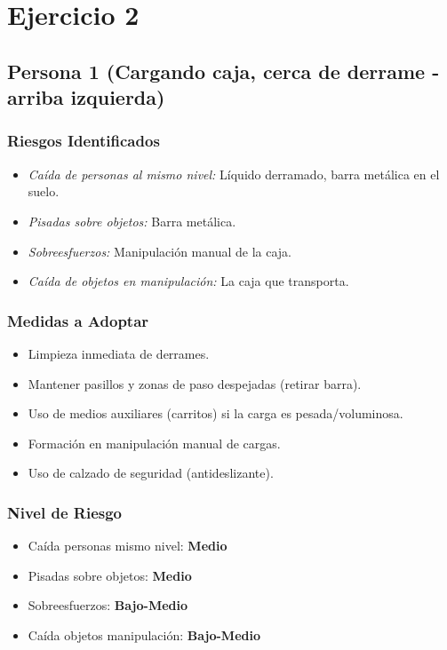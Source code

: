 \documentclass[12pt,a4paper]{article}
\begin{document}
	\hrulefill
	
	\section{Ejercicio 2}
	
	\subsection{Persona 1 (Cargando caja, cerca de derrame - arriba izquierda)}
	
	\subsubsection{Riesgos Identificados}
	\begin{itemize}
		\item \textit{Caída de personas al mismo nivel:} Líquido derramado, barra metálica en el suelo.
		\item \textit{Pisadas sobre objetos:} Barra metálica.
		\item \textit{Sobreesfuerzos:} Manipulación manual de la caja.
		\item \textit{Caída de objetos en manipulación:} La caja que transporta.
	\end{itemize}
	
	\subsubsection{Medidas a Adoptar}
	\begin{itemize}
		\item Limpieza inmediata de derrames.
		\item Mantener pasillos y zonas de paso despejadas (retirar barra).
		\item Uso de medios auxiliares (carritos) si la carga es pesada/voluminosa.
		\item Formación en manipulación manual de cargas.
		\item Uso de calzado de seguridad (antideslizante).
	\end{itemize}
	
	\subsubsection{Nivel de Riesgo}
	\begin{itemize}
		\item Caída personas mismo nivel: \textbf{Medio}
		\item Pisadas sobre objetos: \textbf{Medio}
		\item Sobreesfuerzos: \textbf{Bajo-Medio}
		\item Caída objetos manipulación: \textbf{Bajo-Medio}
	\end{itemize}
	
\end{document}
